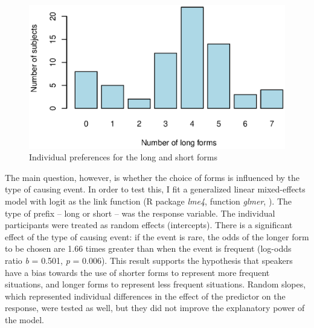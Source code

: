 \documentclass[output=paper]{langsci/langscibook}
\begin{document}
  

\begin{figure}

\includegraphics[width=\textwidth]{figures/Figure4.eps}
\caption{Individual preferences for the long and short forms}
\label{fig:levshina:4}
\end{figure}



The main question, however, is whether the choice of forms is influenced by the type of causing event. In order to test this, I fit a generalized linear mixed-effects model with logit as the link function (R package \textit{lme4}, function \textit{glmer}, \citealt{BatesEtAl2015}). The type of prefix – long or short – was the response variable. The individual participants were treated as random effects (intercepts). There is a significant effect of the type of causing event: if the event is rare, the odds of the longer form to be chosen are 1.66 times greater than when the event is frequent (log-odds ratio \textit{b} = 0.501, \textit{p} = 0.006). This result supports the hypothesis that speakers have a bias towards the use of shorter forms to represent more frequent situations, and longer forms to represent less frequent situations. Random slopes, which represented individual differences in the effect of the predictor on the response, were tested as well, but they did not improve the explanatory power of the model. 
\end{document}

